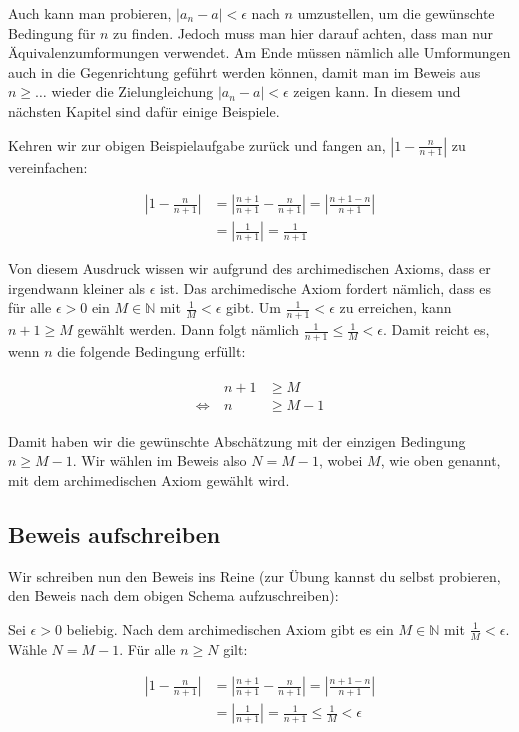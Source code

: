 \documentclass[fontsize=9pt,
               parskip=half-,
               DIV=14,
               listof=chapterentry,
               tocflat]{scrbook}
\begin{document}
Auch kann man probieren, $|a_{n}-a|<\epsilon $ nach $n$ umzustellen, um die gewünschte Bedingung für $n$ zu finden. Jedoch muss man hier darauf achten, dass man nur Äquivalenzumformungen verwendet. Am Ende müssen nämlich alle Umformungen auch in die Gegenrichtung geführt werden können, damit man im Beweis aus $n\geq \ldots $ wieder die Zielungleichung $|a_{n}-a|<\epsilon $ zeigen kann. In diesem und nächsten Kapitel sind dafür einige Beispiele.



Kehren wir zur obigen Beispielaufgabe zurück und fangen an, $\left|1-{\tfrac {n}{n+1}}\right|$ zu vereinfachen:

\begin{align*}
\left|1-{\frac {n}{n+1}}\right|&=\left|{\frac {n+1}{n+1}}-{\frac {n}{n+1}}\right|=\left|{\frac {n+1-n}{n+1}}\right|\\[0.5em]&=\left|{\frac {1}{n+1}}\right|={\frac {1}{n+1}}
\end{align*}

Von diesem Ausdruck wissen wir aufgrund des archimedischen Axioms, dass er irgendwann kleiner als $\epsilon $ ist. Das archimedische Axiom fordert nämlich, dass es für alle $\epsilon >0$ ein $M\in \mathbb {N} $ mit ${\tfrac {1}{M}}<\epsilon $ gibt. Um ${\tfrac {1}{n+1}}<\epsilon $ zu erreichen, kann $n+1\geq M$ gewählt werden. Dann folgt nämlich ${\tfrac {1}{n+1}}\leq {\tfrac {1}{M}}<\epsilon $. Damit reicht es, wenn $n$ die folgende Bedingung erfüllt:

\begin{align*}
{\begin{array}{rrl}&n+1&\geq M\\\Leftrightarrow \ &n&\geq M-1\end{array}}
\end{align*}

Damit haben wir die gewünschte Abschätzung mit der einzigen Bedingung $n\geq M-1$. Wir wählen im Beweis also $N=M-1$, wobei $M$, wie oben genannt, mit dem archimedischen Axiom gewählt wird.

\subsection{Beweis aufschreiben}

Wir schreiben nun den Beweis ins Reine (zur Übung kannst du selbst probieren, den Beweis nach dem obigen Schema aufzuschreiben):

\begin{proof*}
Sei $\epsilon >0$ beliebig. Nach dem archimedischen Axiom gibt es ein $M\in \mathbb {N} $ mit ${\tfrac {1}{M}}<\epsilon $. Wähle $N=M-1$. Für alle $n\geq N$ gilt:

\begin{align*}
\left|1-{\frac {n}{n+1}}\right|&=\left|{\frac {n+1}{n+1}}-{\frac {n}{n+1}}\right|=\left|{\frac {n+1-n}{n+1}}\right|\\[0.5em]&=\left|{\frac {1}{n+1}}\right|={\frac {1}{n+1}}\leq {\frac {1}{M}}<\epsilon 
\end{align*}

\end{proof*}
\end{document}
